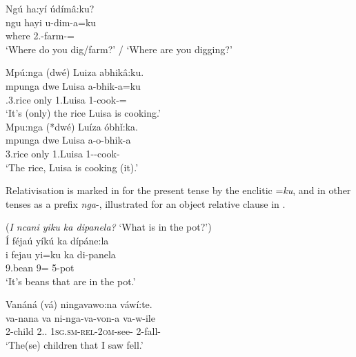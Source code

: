 \documentclass[output=paper]{langscibook}
\begin{document}
\ea
\label{bkm:Ref141428691}
Ngú ha:yí údímâ:ku?\\
\gll
ngu  hayi  u-dim-a=ku\\
\COP{}  where  2\SG.\SM{}-farm-\FV{}=\REL{}\\
\glt
‘Where do you dig/farm?’ / ‘Where are you digging?’\\

\z

\ea\label{bkm:Ref141428713}
\ea
\label{bkm:Ref141428713:a}
Mpú:nga (dwé) Luiza abhikâ:ku.\\
\gll
mpunga  dwe  Luisa  a-bhik-a=ku\\
\COP{}.3.rice  only  1.Luisa  1\SM{}-cook-\FV{}=\REL{}\\
\glt
‘It’s (only) the rice Luisa is cooking.’\\


\ex
\label{bkm:Ref141428713:b}
Mpu:nga (*dwé) Luíza óbhǐ:ka.\\
\gll
mpunga  dwe  Luisa  a-o-bhik-a\\
3.rice  only  1.Luisa  1\SM{}-\PROG{}-cook-\FV{}\\
\glt
‘The rice, Luisa is cooking (it).’\\

\z
\z

Relativisation is marked in  for the present tense by the enclitic =\textit{ku}, and in other tenses as a prefix \textit{nga}\nobreakdash-, illustrated for an object relative clause in .

\ea
\label{bkm:Ref120692880}
(\textit{I ncani yiku ka dipanela?} ‘What is in the pot?’)\\
Í féjaú yíkú ka dípáne:la\\
\gll
i  fejau  yi=ku  ka  di-panela\\
\COP{}  9.bean  9\SM{}=\REL{}  \LOC{}  5-pot\\
\glt
‘It’s beans that are in the pot.’\\

\z

\ea
\label{bkm:Ref127261683}
Vanáná (vá) ningavawo:na váwí:te.\\
\gll
va-nana  va  ni-nga-va-von-a  va-w-ile\\
2-child  2.\DEM.\PROX{}  1\textsc{sg.sm-rel-2om}{}-see-\FV{}  2\SM{}-fall-\PFV{}\\
\glt
‘The(se) children that I saw fell.’\\
\end{document}
